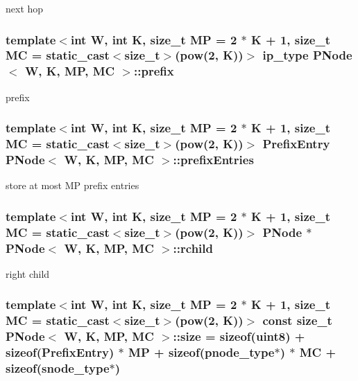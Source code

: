 next hop 

\hypertarget{structPNode_a801a5a133c2b7e0546c00dda35626ead}{
\subsubsection[{prefix}]{\setlength{\rightskip}{0pt plus 5cm}template$<$int W, int K, size\-\_\-t M\-P = 2 $\ast$ K + 1, size\-\_\-t M\-C = static\-\_\-cast$<$size\-\_\-t$>$(pow(2, K))$>$ {\bf ip\-\_\-type} {\bf P\-Node}$<$ {\bf W}, K, M\-P, M\-C $>$\-::{\bf prefix}}}\label{structPNode_a801a5a133c2b7e0546c00dda35626ead}


prefix 

\hypertarget{structPNode_a477430658ef15677735be12d8143ca1a}{
\subsubsection[{prefix\-Entries}]{\setlength{\rightskip}{0pt plus 5cm}template$<$int W, int K, size\-\_\-t M\-P = 2 $\ast$ K + 1, size\-\_\-t M\-C = static\-\_\-cast$<$size\-\_\-t$>$(pow(2, K))$>$ {\bf Prefix\-Entry} {\bf P\-Node}$<$ {\bf W}, K, M\-P, M\-C $>$\-::prefix\-Entries}}\label{structPNode_a477430658ef15677735be12d8143ca1a}


store at most M\-P prefix entries 

\hypertarget{structPNode_a90d84fa69af0037418ffa2e42e5155f9}{
\subsubsection[{rchild}]{\setlength{\rightskip}{0pt plus 5cm}template$<$int W, int K, size\-\_\-t M\-P = 2 $\ast$ K + 1, size\-\_\-t M\-C = static\-\_\-cast$<$size\-\_\-t$>$(pow(2, K))$>$ {\bf P\-Node} $\ast$ {\bf P\-Node}$<$ {\bf W}, K, M\-P, M\-C $>$\-::rchild}}\label{structPNode_a90d84fa69af0037418ffa2e42e5155f9}


right child 

\hypertarget{structPNode_a03fb09f6c82e9d2a8f4367758c767abc}{
\subsubsection[{size}]{\setlength{\rightskip}{0pt plus 5cm}template$<$int W, int K, size\-\_\-t M\-P = 2 $\ast$ K + 1, size\-\_\-t M\-C = static\-\_\-cast$<$size\-\_\-t$>$(pow(2, K))$>$ const size\-\_\-t {\bf P\-Node}$<$ {\bf W}, K, M\-P, M\-C $>$\-::size = sizeof({\bf uint8}) + sizeof({\bf Prefix\-Entry}) $\ast$ M\-P + sizeof({\bf pnode\-\_\-type}$\ast$) $\ast$ M\-C + sizeof({\bf snode\-\_\-type}$\ast$)\hspace{0.3cm}{\ttfamily [static]}}}\label{structPNode_a03fb09f6c82e9d2a8f4367758c767abc}


